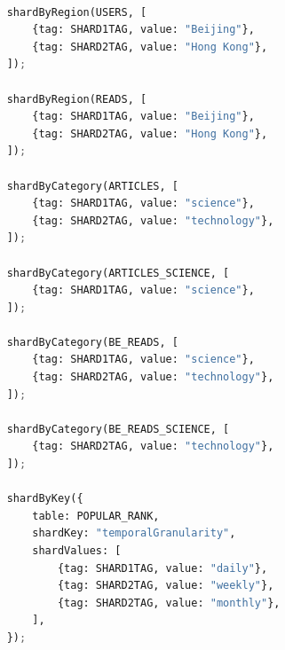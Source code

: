 \documentclass{report}
\begin{document}
    \begin{lstlisting}[language=python, caption=Sharding of each collection]

    shardByRegion(USERS, [
        {tag: SHARD1TAG, value: "Beijing"},
        {tag: SHARD2TAG, value: "Hong Kong"},
    ]);

    shardByRegion(READS, [
        {tag: SHARD1TAG, value: "Beijing"},
        {tag: SHARD2TAG, value: "Hong Kong"},
    ]);

    shardByCategory(ARTICLES, [
        {tag: SHARD1TAG, value: "science"},
        {tag: SHARD2TAG, value: "technology"},
    ]);

    shardByCategory(ARTICLES_SCIENCE, [
        {tag: SHARD1TAG, value: "science"},
    ]);

    shardByCategory(BE_READS, [
        {tag: SHARD1TAG, value: "science"},
        {tag: SHARD2TAG, value: "technology"},
    ]);

    shardByCategory(BE_READS_SCIENCE, [
        {tag: SHARD2TAG, value: "technology"},
    ]);

    shardByKey({
        table: POPULAR_RANK,
        shardKey: "temporalGranularity",
        shardValues: [
            {tag: SHARD1TAG, value: "daily"},
            {tag: SHARD2TAG, value: "weekly"},
            {tag: SHARD2TAG, value: "monthly"},
        ],
    });
    \end{lstlisting}
\end{document}
